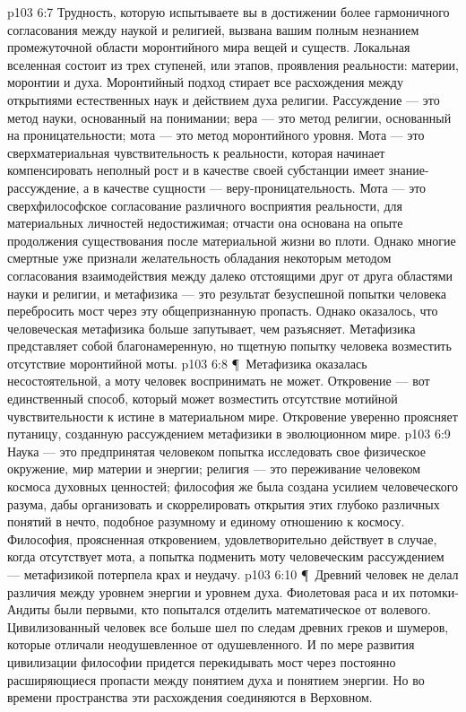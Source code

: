 \vs p103 6:7 Трудность, которую испытываете вы в достижении более гармоничного согласования между наукой и религией, вызвана вашим полным незнанием промежуточной области моронтийного мира вещей и существ. Локальная вселенная состоит из трех ступеней, или этапов, проявления реальности: материи, моронтии и духа. Моронтийный подход стирает все расхождения между открытиями естественных наук и действием духа религии. Рассуждение --- это метод науки, основанный на понимании; вера --- это метод религии, основанный на проницательности; мота --- это метод моронтийного уровня. Мота --- это сверхматериальная чувствительность к реальности, которая начинает компенсировать неполный рост и в качестве своей субстанции имеет знание\hyp{}рассуждение, а в качестве сущности --- веру\hyp{}проницательность. Мота --- это сверхфилософское согласование различного восприятия реальности, для материальных личностей недостижимая; отчасти она основана на опыте продолжения существования после материальной жизни во плоти. Однако многие смертные уже признали желательность обладания некоторым методом согласования взаимодействия между далеко отстоящими друг от друга областями науки и религии, и метафизика --- это результат безуспешной попытки человека перебросить мост через эту общепризнанную пропасть. Однако оказалось, что человеческая метафизика больше запутывает, чем разъясняет. Метафизика представляет собой благонамеренную, но тщетную попытку человека возместить отсутствие моронтийной моты.
\vs p103 6:8 \P\ Метафизика оказалась несостоятельной, а моту человек воспринимать не может. Откровение --- вот единственный способ, который может возместить отсутствие мотийной чувствительности к истине в материальном мире. Откровение уверенно проясняет путаницу, созданную рассуждением метафизики в эволюционном мире.
\vs p103 6:9 Наука --- это предпринятая человеком попытка исследовать свое физическое окружение, мир материи и энергии; религия --- это переживание человеком космоса духовных ценностей; философия же была создана усилием человеческого разума, дабы организовать и скоррелировать открытия этих глубоко различных понятий в нечто, подобное разумному и единому отношению к космосу. Философия, проясненная откровением, удовлетворительно действует в случае, когда отсутствует мота, а попытка подменить моту человеческим рассуждением --- метафизикой потерпела крах и неудачу.
\vs p103 6:10 \P\ Древний человек не делал различия между уровнем энергии и уровнем духа. Фиолетовая раса и их потомки\hyp{}Андиты были первыми, кто попытался отделить математическое от волевого. Цивилизованный человек все больше шел по следам древних греков и шумеров, которые отличали неодушевленное от одушевленного. И по мере развития цивилизации философии придется перекидывать мост через постоянно расширяющиеся пропасти между понятием духа и понятием энергии. Но во времени пространства эти расхождения соединяются в Верховном.
